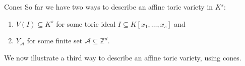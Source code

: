 \documentclass[mathserif,handout]{beamer}
\newcommand{\Z}{\mathbb Z}
\theoremstyle{plain}
\theoremstyle{definition}
\theoremstyle{remark}
\begin{document}
\begin{frame}
{Cones}%
So far we have two ways to describe an affine toric variety in $K^s$:

\pause
\begin{enumerate}[]
\item $V(I)\subseteq K^s$ for some toric ideal $I\subseteq K[x_1,\dots,x_s]$ and 

\pause
\item $Y_{\mathscr A}$ for some finite set $\mathscr A\subseteq \Z^d$.
\end{enumerate}

\pause
We now illustrate a third way to describe an affine toric variety, using cones.
\end{frame}
\end{document}
